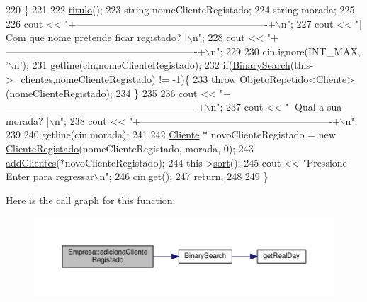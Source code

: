 \begin{DoxyCode}
220                                        \{
221 
222     \hyperlink{classEmpresa_ad79f7196a8ce7256771cbd7b9542155c}{titulo}();
223     \textcolor{keywordtype}{string} nomeClienteRegistado;
224     \textcolor{keywordtype}{string} morada;
225 
226     cout << \textcolor{stringliteral}{"+----------------------------------------------------------+\(\backslash\)n"};
227     cout << \textcolor{stringliteral}{"| Com que nome pretende ficar registado?                   |\(\backslash\)n"};
228     cout << \textcolor{stringliteral}{"+----------------------------------------------------------+\(\backslash\)n"};
229 
230     cin.ignore(INT\_MAX, \textcolor{charliteral}{'\(\backslash\)n'});
231     getline(cin,nomeClienteRegistado);
232     \textcolor{keywordflow}{if}(\hyperlink{extras_8h_abc85c93edf561168b5bbee8054caa388}{BinarySearch}(this->\_clientes,nomeClienteRegistado) != -1)\{
233         \textcolor{keywordflow}{throw} \hyperlink{classObjetoRepetido}{ObjetoRepetido<Cliente>}(nomeClienteRegistado);
234     \}
235 
236     cout << \textcolor{stringliteral}{"+----------------------------------------------------------+\(\backslash\)n"};
237     cout << \textcolor{stringliteral}{"| Qual a sua morada?                                       |\(\backslash\)n"};
238     cout << \textcolor{stringliteral}{"+----------------------------------------------------------+\(\backslash\)n"};
239 
240     getline(cin,morada);
241 
242     \hyperlink{classCliente}{Cliente} * novoClienteRegistado = \textcolor{keyword}{new} \hyperlink{classClienteRegistado}{ClienteRegistado}(nomeClienteRegistado,
      morada, 0);
243     \hyperlink{classEmpresa_a57597ec4154f274686bc648ccf5d2a59}{addClientes}(*novoClienteRegistado);
244     this->\hyperlink{classEmpresa_aa7424cde3bdf1b1921967bc176d0ab50}{sort}();
245     cout << \textcolor{stringliteral}{"Pressione Enter para regressar\(\backslash\)n"};
246     cin.get();
247     \textcolor{keywordflow}{return};
248 
249 \}
\end{DoxyCode}


Here is the call graph for this function\+:
\nopagebreak
\begin{figure}[H]
\begin{center}
\leavevmode
\includegraphics[width=350pt]{classEmpresa_a430c00a63ef70338de3b4b7c096ea194_cgraph}
\end{center}
\end{figure}


